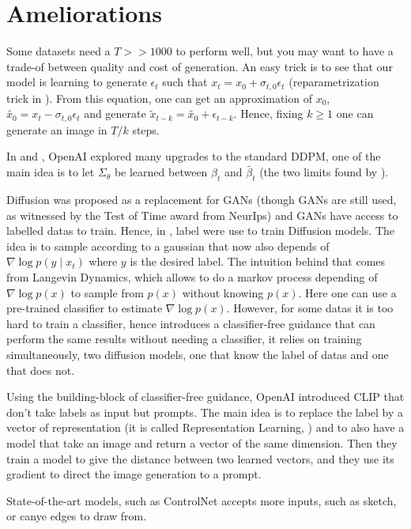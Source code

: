 \documentclass[a4paper,11pt]{article}
\begin{document}
\section{Ameliorations}

Some datasets need a $T >> 1000$ to perform well, but you may want to have a trade-of between quality and cost of generation. An easy trick is to see that our model is learning to generate $\epsilon_t$ such that $x_t = x_0 + \sigma_{t,0} \epsilon_t$ (reparametrization trick in \cite{hoDenoisingDiffusionProbabilistic2020}). From this equation, one can get an approximation of $x_0$, $\tilde{x_0} = x_t - \sigma_{t,0} \epsilon_t$ and generate $\tilde{x}_{t-k} = \tilde{x_0} + \epsilon_{t-k}$.  Hence, fixing $k \geq 1$ one can generate an image in $T/k$ steps.

In \cite{nicholImprovedDenoisingDiffusion2021} and \cite{dhariwalDiffusionModelsBeat2021}, OpenAI explored many upgrades to the standard DDPM, one of the main idea is to let $\Sigma_\theta$ be learned between $\beta_t$ and $\tilde{\beta_t}$ (the two limits found by \cite{hoDenoisingDiffusionProbabilistic2020}).

Diffusion was proposed as a replacement for GANs (though GANs are still used, as witnessed by the Test of Time award from NeurIps) and GANs have access to labelled datas to train. Hence, in \cite{dhariwalDiffusionModelsBeat2021}, label were use to train Diffusion models. The idea is to sample according to a gaussian that now also depends of $\nabla \log p (y \mid x_t)$ where $y$ is the desired label. The intuition behind that comes from Langevin Dynamics, which allows to do a markov process depending of $\nabla \log p(x)$ to sample from $p(x)$ without knowing $p(x)$. Here one can use a pre-trained classifier to estimate $\nabla \log p(x)$. However, for some datas it is too hard to train a classifier, hence \cite{hoClassifierFreeDiffusionGuidance2022} introduces a classifier-free guidance that can perform the same results without needing a classifier, it relies on training simultaneously, two diffusion models, one that know the label of datas and one that does not.

Using the building-block of classifier-free guidance, OpenAI introduced CLIP \cite{radford2021learningtransferablevisualmodels} that don't take labels as input but prompts. The main idea is to replace the label by a vector of representation (it is called Representation Learning, \cite{bengio2014representationlearningreviewnew}) and to also have a model that take an image and return a vector of the same dimension. Then they train a model to give the distance between two learned vectors, and they use its gradient to direct the image generation to a prompt.

State-of-the-art models, such as ControlNet \cite{zhangAddingConditionalControl2023} accepts more inputs, such as sketch, or canye edges to draw from.




\printbibliography %
\end{document}
